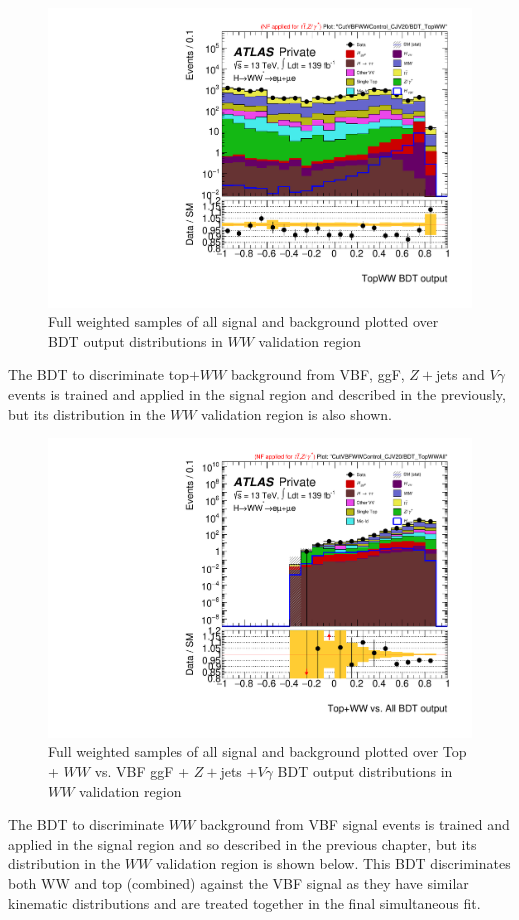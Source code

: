 \begin{figure}[!htbp]
\centering
\includegraphics[width=.6\linewidth]{Pictures/run2-emme-CutVBFWWControl_CJV20-BDT_TopWW-log.pdf}
\caption{Full weighted samples of all signal and background plotted over BDT output distributions in $WW$ validation region}
\label{fig:TopvWWBDTVR}
\end{figure}

The BDT to discriminate top$+WW$ background from VBF, ggF, $Z+$jets and $V\gamma$ events is trained and applied in the signal region and described in the previously, but its distribution in the $WW$ validation region is also shown. 

\begin{figure}[!htbp]
\centering
\includegraphics[width=.6\linewidth]{Pictures/run2-emme-CutVBFWWControl_CJV20-BDT_TopWWAll-log.pdf}
\caption{Full weighted samples of all signal and background plotted over Top + $WW$ vs. VBF ggF + $Z+$jets +$V\gamma$ BDT output distributions in $WW$ validation region}
\label{fig:TopvWWBDTVR}
\end{figure}

The BDT to discriminate $WW$ background from VBF signal events is trained and applied in the signal region and so described in the previous chapter, but its distribution in the $WW$ validation region is shown below. This BDT discriminates both WW and top (combined) against the VBF signal as they have similar kinematic distributions and are treated together in the final simultaneous fit.

